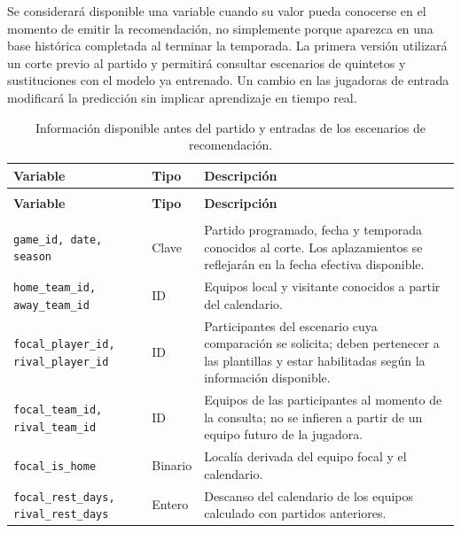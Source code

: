 Se considerará disponible una variable cuando su valor pueda conocerse en el momento de emitir la recomendación, no simplemente porque aparezca en una base histórica completada al terminar la temporada. La primera versión utilizará un corte previo al partido y permitirá consultar escenarios de quintetos y sustituciones con el modelo ya entrenado. Un cambio en las jugadoras de entrada modificará la predicción sin implicar aprendizaje en tiempo real.

\begingroup
\small
{}
\setlength{\tabcolsep}{4pt}
\renewcommand{\arraystretch}{1.15}
\begin{longtable}{@{}>{\raggedright\arraybackslash}p{5.0cm}>{\raggedright\arraybackslash}p{1.9cm}>{\raggedright\arraybackslash}p{7.7cm}@{}}
\caption{Información disponible antes del partido y entradas de los escenarios de recomendación.}\label{tab:variables_previas}\\
\toprule\textbf{Variable}&\textbf{Tipo}&\textbf{Descripción}\\\midrule\endfirsthead
\multicolumn{3}{l}{\small Continuación de la Tabla~\ref{tab:variables_previas}}\\
\toprule\textbf{Variable}&\textbf{Tipo}&\textbf{Descripción}\\\midrule\endhead
\midrule\multicolumn{3}{r}{\small Continúa en la siguiente página}\\\endfoot
\bottomrule\endlastfoot
\texttt{game\_\allowbreak id, date, season} & Clave & Partido programado, fecha y temporada conocidos al corte. Los aplazamientos se reflejarán en la fecha efectiva disponible.\\
\texttt{home\_\allowbreak team\_\allowbreak id, away\_\allowbreak team\_\allowbreak id} & ID & Equipos local y visitante conocidos a partir del calendario.\\
\texttt{focal\_\allowbreak player\_\allowbreak id, rival\_\allowbreak player\_\allowbreak id} & ID & Participantes del escenario cuya comparación se solicita; deben pertenecer a las plantillas y estar habilitadas según la información disponible.\\
\texttt{focal\_\allowbreak team\_\allowbreak id, rival\_\allowbreak team\_\allowbreak id} & ID & Equipos de las participantes al momento de la consulta; no se infieren a partir de un equipo futuro de la jugadora.\\
\texttt{focal\_\allowbreak is\_\allowbreak home} & Binario & Localía derivada del equipo focal y el calendario.\\
\texttt{focal\_\allowbreak rest\_\allowbreak days, rival\_\allowbreak rest\_\allowbreak days} & Entero & Descanso del calendario de los equipos calculado con partidos anteriores.\\

\end{longtable}
